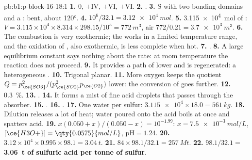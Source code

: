 \begin{solution}{pb:b1:p-block-16-18:1}
\textbf{1.} 0, $+$IV, $+$VI, $+$VI.
\textbf{2.} .
\textbf{3.} S with two bonding domains and a : bent, about
\ang{120}.
\textbf{4.} $10^6/32.1 = \qty{3.12e4}{mol}$.
\textbf{5.} \qty{3.115e4}{mol} of : $V = 3.115 \times 10^4 \times
8.314 \times 298.15/10^5 = \qty{772}{m^3}$, air $772/0.21 = \qty{3.7e3}{m^3}$.
\textbf{6.} The combustion is very exothermic; the  works in a
limited temperature range, and the oxidation of , also
exothermic, is less complete when hot.
\textbf{7.} .
\textbf{8.} A large equilibrium constant says nothing about the rate: at
room temperature the reaction does not proceed.
\textbf{9.} It provides a path of lower  and is
regenerated: a heterogeneous .
\textbf{10.} Trigonal planar.
\textbf{11.} More oxygen keeps the quotient
$Q = p_{\ce{SO3}}^2/(p_{\ce{SO2}}^2 p_{\ce{O2}})$ lower: the conversion
of  goes further.
\textbf{12.} \qty{0.3}{\percent}.
\textbf{13.} .
\textbf{14.} It forms a mist of fine acid droplets that passes through the
absorber.
\textbf{15.} .
\textbf{16.} .
\textbf{17.} One water per sulfur: $\num{3.115e4} \times 18.0 =
\qty{561}{kg}$.
\textbf{18.} Dilution releases a lot of heat; water poured onto the acid
boils at once and spatters acid.
\textbf{19.} $x(0.050 + x)/(0.050 - x) = 10^{-1.99}$: $x = \qty{7.5e-3}{mol/L}$,
$[\ce{H3O+}] = \qty{0.0575}{mol/L}$, $\mathrm{pH} = 1.24$.
\textbf{20.} $3.12 \times 10^4 \times 0.995 \times 98.1 = \qty{3.04}{t}$.
\textbf{21.} $84 \times 98.1/32.1 = \qty{257}{Mt}$.
\textbf{22.} $98.1/32.1 =$ \textbf{\qty{3.06}{t} of sulfuric acid per tonne of
sulfur}.
\end{solution}
